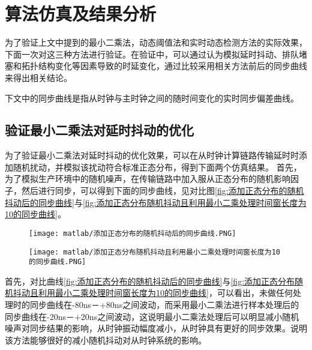 \section{算法仿真及结果分析}
为了验证上文中提到的最小二乘法，动态阈值法和实时动态检测方法的实际效果，下面一次对这三种方法进行验证。在验证中，可以通过认为模拟延时抖动、排队堵塞和拓扑结构变化等因素导致的时延变化，通过比较采用相关方法前后的同步曲线来得出相关结论。

下文中的同步曲线是指从时钟与主时钟之间的随时间变化的实时同步偏差曲线。

\subsection{验证最小二乘法对延时抖动的优化}
为了验证最小二乘法对延时抖动的优化效果，可以在从时钟计算链路传输延时时添加随机扰动，并模拟该扰动符合标准正态分布，得到下面两个仿真结果。
首先，为了模拟生产环境中的随机噪声，在传输链路中加入服从正态分布的随机影响因子，然后进行同步，可以得到下面的同步曲线，见对比图\ref{fig:添加正态分布的随机抖动后的同步曲线}与\ref{fig:添加正态分布随机抖动且利用最小二乘处理时间窗长度为10的同步曲线}。
\begin{figure}[!hbp]
  \centering
  \begin{minipage}[b]{1\textwidth}
    \captionstyle{\centering}
    \centering
    \texttt{[image: matlab/添加正态分布的随机抖动后的同步曲线.PNG]}
  \end{minipage}     
\end{figure}

\begin{figure}[!hbp]
  \centering
  \begin{minipage}[b]{1\textwidth}
    \captionstyle{\centering}
    \centering
    \texttt{[image: matlab/添加正态分布随机抖动且利用最小二乘处理时间窗长度为10的同步曲线.PNG]}
  \end{minipage}     
\end{figure}

首先，对比曲线\ref{fig:添加正态分布的随机抖动后的同步曲线}与\ref{fig:添加正态分布随机抖动且利用最小二乘处理时间窗长度为10的同步曲线}，可以看出，未做任何处理时的同步曲线在-80ns－+80ns之间波动，而采用最小二乘法进行样本处理后的同步曲线在-20ns－+20ns之间波动，这说明最小二乘法处理后可以明显减小随机噪声对同步结果的影响，从时钟振动幅度减小，从时钟具有更好的同步效果。说明该方法能够很好的减小随机抖动对从时钟系统的影响。

